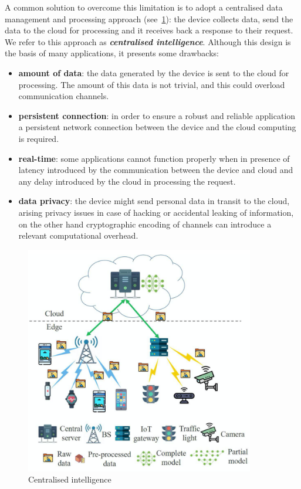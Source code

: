 A common solution to overcome this limitation is to adopt a centralised data
management and processing approach
(see~\ref{fig:centralised_intelligence}): the device collects data, send the
data to the cloud for processing and it receives back a response to their
request. We refer to this approach as
\textbf{\textit{centralised intelligence}}.
Although this design is the basis of many applications, it presents some
drawbacks:
\begin{itemize}
    \item \textbf{amount of data}: the data generated by the device is sent to
        the cloud for processing. The amount of this data is not trivial, and
        this could overload communication channels.
    \item \textbf{persistent connection}: in order to ensure a robust and
        reliable application a persistent network connection between the device
        and the cloud computing is required.
    \item \textbf{real-time}: some applications cannot function properly when
        in presence of latency introduced by the communication between the
        device and cloud and any delay introduced by the cloud in processing
        the request.
    \item \textbf{data privacy}: the device might send personal data in transit
        to the cloud, arising privacy issues in case of hacking or accidental
        leaking of information, on the other hand cryptographic encoding of
        channels can introduce a relevant computational overhead.
\end{itemize}

\begin{figure}[ht]
    \includegraphics[width=10cm]{images/introduction/centralised_intelligence.png}
    \centering
    \caption{Centralised intelligence}\label{fig:centralised_intelligence}
\end{figure}

